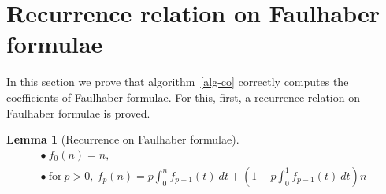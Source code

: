 \documentclass[a4paper,10pt]{amsart}
\newtheorem{lemma}{Lemma}
\theoremstyle{remark}
\begin{document}
\section{Recurrence relation on Faulhaber formulae}
\label{sec:proof}
In this section we prove that algorithm~\ref{alg-co} correctly
computes the coefficients of Faulhaber formulae. For this, first, a
recurrence relation on Faulhaber formulae is proved.


\begin{lemma}[Recurrence on Faulhaber formulae]
\label{main-thm}
\[
\begin{array}{l}
\bullet\ f_0(n)=n,\\ 
\bullet\ \mbox{for}\ p>0,\
f_{p}(n)=p\int^n_0 f_{p-1}(t)\ dt +
(1-p\int^1_0 
f_{p-1}(t)\ dt)n\ 
\end{array}
\]
\end{lemma}
\end{document}
